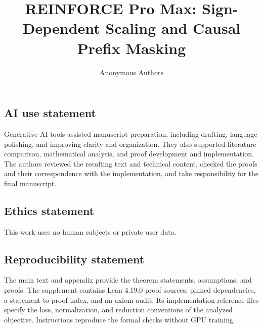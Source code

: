 \documentclass{article}
\title{REINFORCE Pro Max: Sign-Dependent Scaling and Causal Prefix Masking}
\author{Anonymous Authors}
\theoremstyle{plain}
\theoremstyle{definition}
\begin{document}
\maketitle

\begin{abstract}

\end{abstract}

\label{sec:iclr-main-end}
\clearpage

\subsection*{AI use statement}
Generative AI tools assisted manuscript preparation, including drafting,
language polishing, and improving clarity and organization. They also
supported literature comparison, mathematical analysis, and proof
development and implementation. The authors reviewed the resulting text
and technical content, checked the proofs and their correspondence with
the implementation, and take responsibility for the final manuscript.

\subsection*{Ethics statement}
This work uses no human subjects or private user data.

\subsection*{Reproducibility statement}
The main text and appendix provide the theorem statements, assumptions, and
proofs. The supplement contains Lean 4.19.0 proof sources, pinned dependencies,
a statement-to-proof index, and an axiom audit. Its implementation reference
files specify the loss, normalization, and reduction conventions of the
analyzed objective. Instructions reproduce the formal checks without GPU training.





\end{document}
